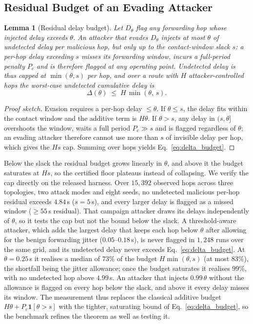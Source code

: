 \documentclass[conference,letterpaper,10pt]{IEEEtran}   %
\newtheorem{lemma}{Lemma}
\begin{document}
\subsection{Residual Budget of an Evading Attacker}
\begin{lemma}[Residual delay budget]
\label{lem:residual}
Let $D_\theta$ flag any forwarding hop whose injected delay exceeds $\theta$. An
attacker that evades $D_\theta$ injects at most $\theta$ of undetected delay per
malicious hop, but only up to the contact-window slack $s$: a per-hop delay
exceeding $s$ misses its forwarding window, incurs a full-period penalty
$P_{\!c}$ and is therefore flagged at any operating point. Undetected delay is
thus capped at $\min(\theta,s)$ per hop, and over a route with $H$
attacker-controlled hops the worst-case undetected cumulative delay is
\begin{equation}
\label{eq:delta_budget}
\Delta(\theta) \;\le\; H\,\min(\theta,\,s).
\end{equation}
\end{lemma}
\begin{proof}[Proof sketch]
Evasion requires a per-hop delay $\le\theta$. If $\theta\le s$, the delay fits
within the contact window and the additive term is $H\theta$. If $\theta>s$, any
delay in $(s,\theta]$ overshoots the window, waits a full period
$P_{\!c}\gg s$ and is flagged regardless of $\theta$; an evading attacker
therefore cannot use more than $s$ of invisible delay per hop, which gives the
$Hs$ cap. Summing over hops yields Eq.~\eqref{eq:delta_budget}.
\end{proof}

Below the slack the residual budget grows linearly in $\theta$, and above it the
budget saturates at $Hs$, so the certified floor plateaus instead of
collapsing. We verify the cap directly on the released harness. Over
$15{,}392$ observed hops across three topologies, two attack modes and eight
seeds, no undetected malicious per-hop residual exceeds $4.84$\,s ($s=5$\,s),
and every larger delay is flagged as a missed window ($\ge55$\,s residual). That
campaign attacker draws its delays independently of $\theta$, so it tests the
cap but not the bound below the slack. A threshold-aware attacker, which adds
the largest delay that keeps each hop below $\theta$ after allowing for the
benign forwarding jitter ($0.05$--$0.18$\,s), is never flagged in $1{,}248$ runs
over the same grid, and its undetected delay never exceeds
Eq.~\eqref{eq:delta_budget}. At $\theta=0.25$\,s it realises a median of $73\%$
of the budget $H\min(\theta,s)$ (at most $83\%$), the shortfall being the jitter
allowance; once the budget saturates it realises $99\%$, with no undetected hop
above $4.99$\,s. An attacker that injects $0.99\,\theta$ without the allowance
is flagged on every hop below the slack, and above it every delay misses its
window. The measurement thus replaces the classical additive budget
$H\theta+P_{\!c}\mathbf{1}[\theta>s]$ with the tighter, saturating bound of
Eq.~\eqref{eq:delta_budget}, so the benchmark refines the theorem as well as
testing it.
\end{document}
